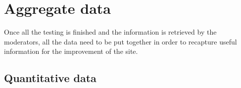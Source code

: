 \begin{center}
\end{center}









\section{Aggregate data}
Once all the testing is finished and the information is retrieved by the moderators, all the data need to be put together in order to recapture useful information for the improvement of the site.

\subsection{Quantitative data}

